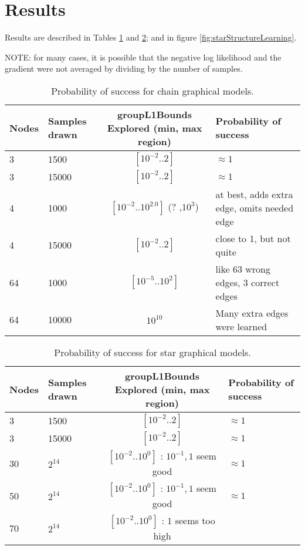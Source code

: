 \documentclass[oneside, article]{memoir}
\begin{document}
\section{Results}
Results are described in Tables \ref{tab:chainStructureLearning} and \ref{tab:starStructureLearning}; and in figure \ref{fig:starStructureLearning}.

NOTE: for many cases, it is possible that the negative log likelihood and the gradient were not averaged by dividing by the number of samples.

\begin{table}[h]
\begin{tabular}{| p{2 cm} | p{2 cm} | c | p{2 cm} |} \hline
Nodes& Samples drawn& groupL1Bounds Explored (min, max region)& Probability of success\\ \hline\hline
3& 1500& $[10^{-2} .. 2]$ & $\approx 1$\\ \hline
3& 15000& $[10^{-2} .. 2]$ & $\approx 1$\\ \hline\hline
4& 1000& $[10^{-2} .. 10^{2.0}]$ (? ,$10^{3}$)& at best, adds extra edge, omits needed edge\\ \hline
4& 15000& $[10^{-2} .. 2]$ & close to 1, but not quite\\ \hline\hline
64& 1000& $[10^{-5} .. 10^2]$ & like 63 wrong edges, 3 correct edges\\ \hline
64& 10000& $10^{10}$& Many extra edges were learned\\ \hline\hline
\end{tabular}
\caption{Probability of success for chain graphical models.}
\label{tab:chainStructureLearning}
\end{table}

\begin{table}[h]
\begin{tabular}{| p{2 cm} | p{2 cm} | c | p{2 cm} |} \hline
Nodes& Samples drawn& groupL1Bounds Explored (min, max region)& Probability of success\\ \hline\hline
3& 1500& $[10^{-2} .. 2]$ & $\approx 1$\\ \hline
3& 15000& $[10^{-2} .. 2]$ & $\approx 1$\\ \hline\hline
30& $2^{14}$& $[10^{-2} .. 10^0]$ : $10^{-1}, 1$ seem good& $\approx 1$\\ \hline\hline
50& $2^{14}$& $[10^{-2} .. 10^0]$ : $10^{-1}, 1$ seem good& $\approx 1$\\ \hline\hline
70& $2^{14}$& $[10^{-2} .. 10^0]$ : $1$ seems too high& \\ \hline\hline
\end{tabular}
\caption{Probability of success for star graphical models.}
\label{tab:starStructureLearning}
\end{table}
\end{document}
